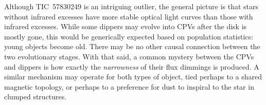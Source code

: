 \documentclass[11pt,twocolumn,tighten]{aastex63}
\newcommand{\kms}{{km\,s$^{-1}$}}
\begin{document}
Although TIC~57830249 is an intriguing outlier, the general picture is that
stars without infrared excesses have more stable optical light curves
than those with infrared excesses.  While some dippers may evolve into CPVs after the
disk is mostly gone, this would be generically expected based on population
statistics: young objects become old.  There may be no
other causal connection between the two evolutionary stages.  With
that said, a common mystery between the CPVs and dippers is how exactly
the {\it narrowness} of their flux dimmings is produced.  
A similar mechanism may operate for both
types of object, tied perhaps to a shared magnetic topology, or
perhaps to a preference for dust to inspiral to the star in clumped
structures.


%
%
%
%
%
\end{document}
